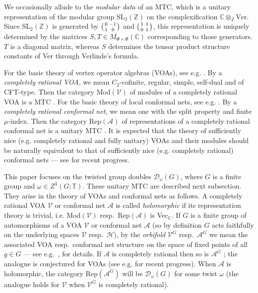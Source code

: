 \documentclass[12pt]{article}
\numberwithin{equation}{section}
\def\cA            {{\mathcal{A}}}
\def\cD            {{\mathcal{D}}}
\def\cH            {{\mathcal{H}}}
\def\cV            {{\mathcal{V}}}
\def\bbC           {\mathbb{C}}
\def\bbT           {\mathbb{T}}
\def\bbZ           {\mathbb{Z}}
\begin{document}
We occasionally allude to the \textit{modular data} of an MTC, which is a unitary representation of
the modular group SL$_2(\bbZ)$ on the complexification $\bbC\otimes_\bbZ\mathrm{Ver}$.
{Since SL$_2(\bbZ)$ is generated by  $\left({0\atop 1}{ -1\atop  \,0}\right)$ and $\left({1\ 1\atop 0\ 1}
\right)$, this representation is uniquely determined by the matrices $S,T\in M_{\Phi\times\Phi}(\bbC)$ corresponding to those generators.} $T$ is a diagonal matrix, {whereas $S$ determines the tensor product structure constants of Ver through Verlinde's formula.} 

For the basic theory of vertex operator algebras (VOAs), see e.g. \cite{LL}. By a \textit{completely rational VOA}, we mean $C_2$-cofinite, regular, simple, self-dual and of CFT-type. Then the category Mod$(\cV)$ of modules of a completely rational VOA is a MTC \cite{Hua}.  For the basic theory of local conformal nets, see e.g. \cite{Kaw}. By a \textit{completely rational conformal net}, we mean one with the split property and finite $\mu$-index. Then the category Rep$(\cA)$ of representations of a completely rational conformal net is a unitary MTC \cite{KLM}. It is expected that the theory of sufficiently nice (e.g. completely rational and fully unitary) VOAs and their modules should be naturally equivalent to that of sufficiently nice (e.g. completely rational) conformal nets --- see \cite{CKLW} for recent progress. 

This paper focuses on  the twisted group doubles $\cD_\omega(G)$, where $G$ is a finite group and $\omega\in Z^3(G;\bbT)$. These unitary  MTC are described next subsection. They arise in the theory of VOAs and conformal nets as follows.  A completely rational VOA $\cV$ or conformal net $\cA$ is called \textit{holomorphic} if its representation theory  is trivial, i.e. Mod$(\cV)$ resp.\ Rep$(\cA)$ is Vec$_\bbC$. If $G$ is a finite group of automorphisms of a VOA $\cV$ or conformal net $\cA$ (so by definition  $ G$ acts faithfully on the underlying spaces $\cV$ resp.\ $\cH$), by the  \textit{orbifold}  $\cV^G$ resp.\ $\cA^G$ we mean the associated VOA resp.\ conformal net structure on the space of fixed points of all $g\in G$ --- see e.g.\ \cite{LL},\cite{Xu} for details. If $\cA$ is completely rational then so is  $\cA^G$ \cite{Xu}; the analogue is conjectured for VOAs (see e.g. \cite{CM} for recent progress). When $\cA$ is holomorphic, the category Rep$(\cA^G)$ will be $\cD_\omega(G)$ for some twist $\omega$ \cite{Kir} (the analogue holds for $\cV$ when $\cV^G$ is completely rational). 
\end{document}
